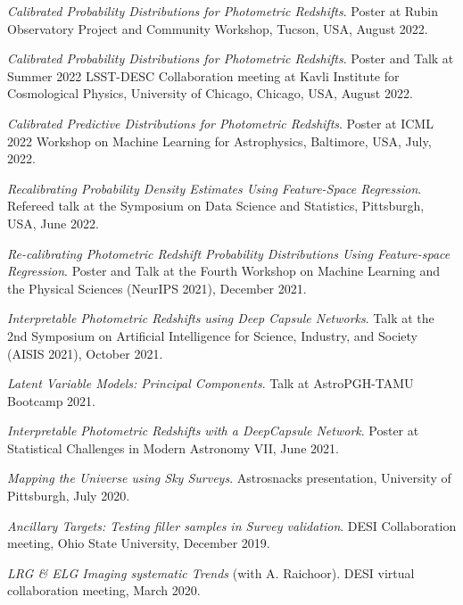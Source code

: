 \begin{etaremune}[leftmargin=40pt,labelsep=10pt]
    \item \textit{Calibrated Probability Distributions for Photometric Redshifts}. Poster at Rubin Observatory Project and Community Workshop, Tucson, USA, August 2022.
    \item \textit{Calibrated Probability Distributions for Photometric Redshifts}. Poster and Talk at Summer 2022 LSST-DESC Collaboration meeting at Kavli Institute for Cosmological Physics, University of Chicago, Chicago, USA, August 2022.
    \item \textit{Calibrated Predictive Distributions for Photometric Redshifts}. Poster at ICML 2022 Workshop on Machine Learning for Astrophysics, Baltimore, USA, July, 2022.
    \item \textit{Recalibrating Probability Density Estimates Using Feature-Space Regression}. Refereed talk at the Symposium on Data Science and Statistics, Pittsburgh, USA, June 2022.
    \item \textit{Re-calibrating Photometric Redshift Probability Distributions Using Feature-space Regression}. Poster and Talk at the Fourth Workshop on Machine Learning and the Physical Sciences (NeurIPS 2021), December 2021.
    \item \textit{Interpretable Photometric Redshifts using Deep Capsule Networks}. Talk at the 2nd Symposium on Artificial Intelligence for Science, Industry, and Society (AISIS 2021), October 2021.
     \item \textit{Latent Variable Models: Principal Components}. Talk at AstroPGH-TAMU Bootcamp 2021.
    \item \textit{Interpretable Photometric Redshifts with a DeepCapsule Network}. Poster at Statistical Challenges in Modern Astronomy VII, June 2021.
    \item \textit{Mapping the Universe using Sky Surveys}. Astrosnacks presentation, University of Pittsburgh, July 2020.
    \item \textit{Ancillary Targets: Testing filler samples in Survey validation}. DESI Collaboration meeting, Ohio State University, December 2019.
    \item \textit{LRG \& ELG Imaging systematic Trends} (with A. Raichoor). DESI virtual collaboration meeting, March 2020.
\end{etaremune}

